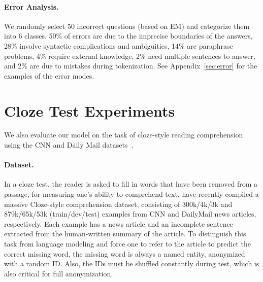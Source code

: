 \documentclass{article} \usepackage{iclr2017_conference,times}
\begin{document}
\paragraph{Error Analysis.} We randomly select 50 incorrect questions (based on EM) and categorize them into 6 classes.
50\% of errors are due to the imprecise boundaries of the answers,
28\% involve syntactic complications and ambiguities,
14\% are paraphrase problems,
4\% require external knowledge,
2\% need multiple sentences to answer,
and 2\% are due to mistakes during tokenization.
See Appendix~\ref{sec:error} for the examples of the error modes. 
\section{Cloze Test Experiments}\label{sec:cnn}
We also evaluate our model on the task of cloze-style reading comprehension using the CNN and Daily Mail datasets~\citep{Hermann2015TeachingMT}.


\paragraph{Dataset.}
In a cloze test, the reader is asked to fill in words that have been removed from a passage, for measuring one's ability to comprehend text. \citet{Hermann2015TeachingMT} have recently compiled a massive Cloze-style comprehension dataset, consisting of 300k/4k/3k and 879k/65k/53k (train/dev/test) examples from CNN and DailyMail news articles, respectively. Each example has a news article and an incomplete sentence extracted from the human-written summary of the article. To distinguish this task from language modeling and force one to refer to the article to predict the correct missing word, the missing word is always a named entity, anonymized with a random ID. 
Also, the IDs must be shuffled constantly during test, which is also critical for full anonymization.
\end{document}
